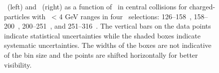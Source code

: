 \begin{figure}
   \caption{\RTheta\ (left) and \RP\ (right) as a function of \rvar\ in central collisions for charged-particles with \pt\ < 4 GeV ranges in four \ptjet\ selections: 126--158~\GeV, 158--200~\GeV, 200--251~\GeV, and 251--316~\GeV. The vertical bars on the data points indicate statistical uncertainties while the shaded boxes indicate systematic uncertainties. The widths of the boxes are not indicative of the bin size and the points are shifted horizontally for better visibility. }
      \label{fig:RPRT}
\end{figure}


%
%
%
%
%
%






